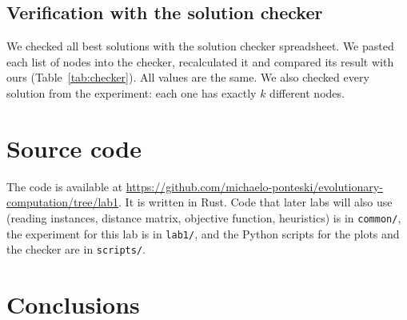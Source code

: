 \documentclass[11pt,a4paper]{article}
\newcommand{\repo}{https://github.com/michaelo-ponteski/evolutionary-computation}
\begin{document}
\subsection*{Verification with the solution checker}

We checked all best solutions with the solution checker spreadsheet. We pasted
each list of nodes into the checker, recalculated it and compared its result
with ours (Table~\ref{tab:checker}). All values are the same. We also checked
every solution from the experiment: each one has exactly $k$ different nodes.

\begin{table}[H]
\centering
\small
\caption{Best solutions: our objective value and the value from the checker.}
\label{tab:checker}

\end{table}

\section{Source code}

The code is available at \url{\repo/tree/lab1}. It is written in Rust. Code
that later labs will also use (reading instances, distance matrix, objective
function, heuristics) is in \texttt{common/}, the experiment for this lab is in
\texttt{lab1/}, and the Python scripts for the plots and the checker are in
\texttt{scripts/}.

\section{Conclusions}
\end{document}
